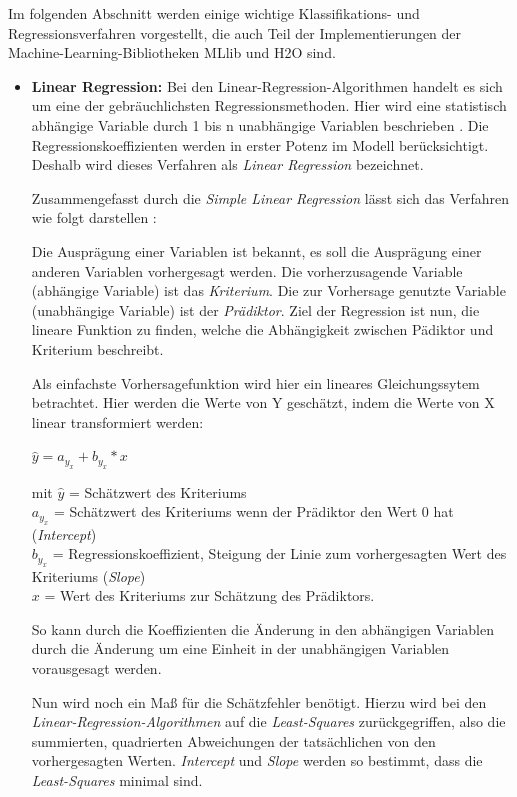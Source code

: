 Im folgenden Abschnitt werden einige wichtige Klassifikations- und Regressionsverfahren vorgestellt, die auch Teil der Implementierungen der Machine-Learning-Bibliotheken MLlib und H2O sind. 

\begin{itemize}

\item \textbf{Linear Regression:} Bei den Linear-Regression-Algorithmen handelt es sich um eine der gebräuchlichsten Regressionsmethoden. Hier wird eine statistisch abhängige Variable durch 1 bis n unabhängige Variablen beschrieben . Die Regressionskoeffizienten werden in erster Potenz im Modell berücksichtigt. Deshalb wird dieses Verfahren als \textit{Linear Regression} bezeichnet. 

Zusammengefasst durch die \textit{Simple Linear Regression} lässt sich das Verfahren wie folgt darstellen :

Die Ausprägung einer Variablen ist bekannt, es soll die Ausprägung einer anderen Variablen vorhergesagt werden.
Die vorherzusagende Variable (abhängige Variable) ist das \textit{Kriterium}.
Die zur Vorhersage genutzte Variable (unabhängige Variable) ist der \textit{Prädiktor}.
Ziel der Regression ist nun, die lineare Funktion zu finden, welche die Abhängigkeit zwischen Pädiktor und Kriterium beschreibt. 

Als einfachste Vorhersagefunktion wird hier ein lineares Gleichungssytem betrachtet. Hier werden die Werte von Y geschätzt, indem die Werte von X linear transformiert werden:

\(\hat{y} = a_y_x + b_y_x * x  \) 

mit \(\hat{y}\) = Schätzwert des Kriteriums \\
\(a_y_x\) = Schätzwert des Kriteriums wenn der Prädiktor den Wert 0 hat (\textit{Intercept}) \\
\(b_y_x\) = Regressionskoeffizient, Steigung der Linie zum vorhergesagten Wert des Kriteriums (\textit{Slope}) \\ 
\(x\) = Wert des Kriteriums zur Schätzung des Prädiktors. 

So kann durch die Koeffizienten die Änderung in den abhängigen Variablen durch die Änderung um eine Einheit in der unabhängigen Variablen vorausgesagt werden.  

Nun wird noch ein Maß für die Schätzfehler benötigt. Hierzu wird bei den \textit{Linear-Regression-Algorithmen} auf die \textit{Least-Squares} zurückgegriffen, also die summierten, quadrierten Abweichungen der tatsächlichen von den vorhergesagten Werten. \textit{Intercept} und \textit{Slope} werden so bestimmt, dass die \textit{Least-Squares} minimal sind. 


\end{itemize}
